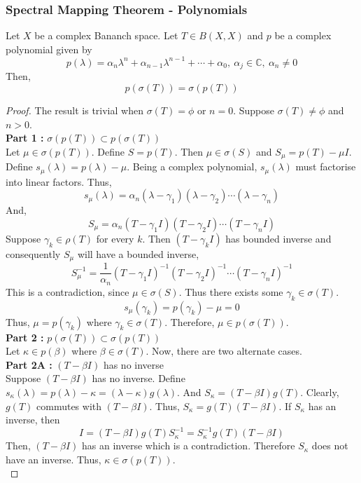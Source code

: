 \subsubsection{Spectral Mapping Theorem - Polynomials}
\begin{theorem}
	Let $X$ be a complex Bananch space.
	Let $T \in B(X,X)$ and $p$ be a complex polynomial given by
	\[ p(\lambda) = \alpha_n \lambda^n + \alpha_{n-1} \lambda^{n-1} + \dotsb + \alpha_0,\ \alpha_j \in \mathbb{C},\ \alpha_n \ne 0 \]
	Then,
	\begin{equation}
		p(\sigma(T)) = \sigma(p(T)) 
	\end{equation}
\end{theorem}
\begin{proof}
	The result is trivial when $\sigma(T) = \phi$ or $n = 0$.
	Suppose $\sigma(T) \ne \phi$ and $n > 0$.\\

	\textbf{Part 1 :} $\sigma(p(T)) \subset p(\sigma(T))$ \\
	Let $\mu \in \sigma(p(T))$.
	Define $S = p(T)$.
	Then $\mu \in \sigma(S)$ and $S_\mu = p(T) - \mu I$.
	Define $s_\mu(\lambda) = p(\lambda)-\mu$.
	Being a complex polynomial, $s_\mu(\lambda)$ must factorise into linear factors.
	Thus,
	\[ s_\mu(\lambda) = \alpha_n (\lambda-\gamma_1)(\lambda-\gamma_2) \dotsm (\lambda-\gamma_n) \]
	And,
	\[ S_\mu = \alpha_n (T-\gamma_1 I)(T-\gamma_2 I) \dotsm (T-\gamma_n I) \]
	Suppose $\gamma_k \in \rho(T)$ for every $k$.
	Then $(T-\gamma_k I)$ has bounded inverse and consequently $S_\mu$ will have a bounded inverse,
	\[ S_\mu^{-1} = \frac{1}{\alpha_n} (T-\gamma_1 I)^{-1} (T-\gamma_2 I)^{-1} \dotsm (T-\gamma_n I)^{-1} \]
	This is a contradiction, since $\mu \in \sigma(S)$.
	Thus there exists some $\gamma_k \in \sigma(T)$.
	\[ s_\mu(\gamma_k) = p(\gamma_k) - \mu = 0 \]
	Thus, $\mu = p(\gamma_k)$ where $\gamma_k \in \sigma(T)$.
	Therefore, $\mu \in p(\sigma(T))$.\\

	\textbf{Part 2 :} $p(\sigma(T)) \subset \sigma(p(T))$\\
	Let $\kappa \in p(\beta)$ where $\beta \in \sigma(T)$.
	Now, there are two alternate cases.\\

	\textbf{Part 2A :} $(T-\beta I)$ has no inverse\\
	Suppose $(T-\beta I)$ has no inverse.
	Define $s_\kappa(\lambda) = p(\lambda)-\kappa = (\lambda-\kappa)g(\lambda)$.
	And $S_\kappa = (T-\beta I)g(T)$.
	Clearly, $g(T)$ commutes with $(T-\beta I)$.
	Thus, $S_\kappa = g(T)(T-\beta I)$.
	If $S_\kappa$ has an inverse, then
	\[ I = (T-\beta I)g(T)S_\kappa^{-1} = S_\kappa^{-1} g(T)(T-\beta I) \]
	Then, $(T-\beta I)$ has an inverse which is a contradiction.
	Therefore $S_\kappa$ does not have an inverse.
	Thus, $\kappa \in \sigma(p(T))$.\\


\end{proof}
